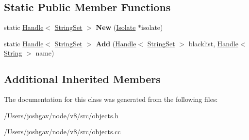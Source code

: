 \subsection*{Static Public Member Functions}
\begin{DoxyCompactItemize}
\item 
static \hyperlink{classv8_1_1internal_1_1_handle}{Handle}$<$ \hyperlink{classv8_1_1internal_1_1_string_set}{String\+Set} $>$ {\bfseries New} (\hyperlink{classv8_1_1internal_1_1_isolate}{Isolate} $\ast$isolate)\hypertarget{classv8_1_1internal_1_1_string_set_aa6784ef9bec1c541906f28a47e719db8}{}\label{classv8_1_1internal_1_1_string_set_aa6784ef9bec1c541906f28a47e719db8}

\item 
static \hyperlink{classv8_1_1internal_1_1_handle}{Handle}$<$ \hyperlink{classv8_1_1internal_1_1_string_set}{String\+Set} $>$ {\bfseries Add} (\hyperlink{classv8_1_1internal_1_1_handle}{Handle}$<$ \hyperlink{classv8_1_1internal_1_1_string_set}{String\+Set} $>$ blacklist, \hyperlink{classv8_1_1internal_1_1_handle}{Handle}$<$ \hyperlink{classv8_1_1internal_1_1_string}{String} $>$ name)\hypertarget{classv8_1_1internal_1_1_string_set_a17f2822f15a3e4a4f3f920cd96c269ed}{}\label{classv8_1_1internal_1_1_string_set_a17f2822f15a3e4a4f3f920cd96c269ed}

\end{DoxyCompactItemize}
\subsection*{Additional Inherited Members}


The documentation for this class was generated from the following files\+:\begin{DoxyCompactItemize}
\item 
/\+Users/joshgav/node/v8/src/objects.\+h\item 
/\+Users/joshgav/node/v8/src/objects.\+cc\end{DoxyCompactItemize}

